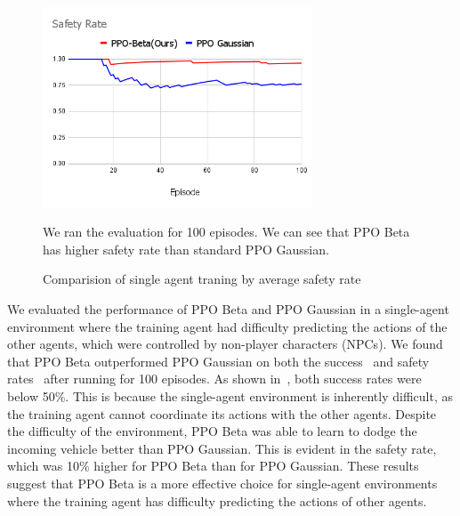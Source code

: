 \begin{figure}[H]
    \centering
    \includegraphics[width=8cm]{assets/single_safety}
    \caption{Comparision of single agent traning by average safety rate}\label{fig:safety_rate}
    \medskip
    \small We ran the evaluation for 100 episodes.
    We can see that PPO Beta has higher safety rate than standard PPO Gaussian.
\end{figure}
We evaluated the performance of PPO Beta and PPO Gaussian in a single-agent environment where the training
agent had difficulty predicting the actions of the other agents,
which were controlled by non-player characters (NPCs). We
found that PPO Beta outperformed PPO Gaussian on both the
success~ and safety rates~ after running for 100 episodes. As
shown in~, both success rates were below 50\%.
This is because the single-agent environment is inherently difficult,
as the training agent cannot coordinate its actions with the other agents.
Despite the difficulty of the environment, PPO Beta was able to learn to dodge the incoming vehicle better
than PPO Gaussian. This is evident in the safety rate, which
was 10\% higher for PPO Beta than for PPO Gaussian. These
results suggest that PPO Beta is a more effective choice for
single-agent environments where the training agent has
difficulty predicting the actions of other agents.


